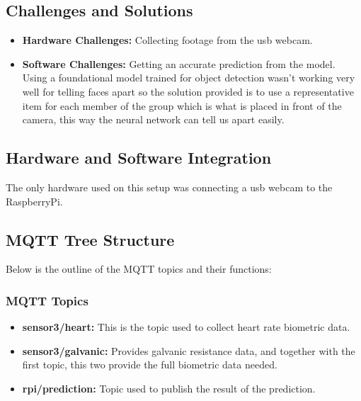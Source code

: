 \documentclass{article}
\begin{document}
\subsection{Challenges and Solutions}
\begin{itemize}
    \item \textbf{Hardware Challenges:} Collecting footage from the usb webcam.
    \item \textbf{Software Challenges:} Getting an accurate prediction from the model. Using a foundational model trained for object detection wasn't working very well for telling faces apart so the solution provided is to use a representative item for each member of the group which is what is placed in front of the camera, this way the neural network can tell us apart easily.
\end{itemize}

\subsection{Hardware and Software Integration}
The only hardware used on this setup was connecting a usb webcam to the RaspberryPi.

\subsection{MQTT Tree Structure}
Below is the outline of the MQTT topics and their functions:

\subsubsection{MQTT Topics}
\begin{itemize}
    \item \textbf{sensor3/heart:} This is the topic used to collect heart rate biometric data.
    \item \textbf{sensor3/galvanic:} Provides galvanic resistance data, and together with the first topic, this two provide the full biometric data needed.
    \item \textbf{rpi/prediction:} Topic used to publish the result of the prediction.
\end{itemize}
\end{document}
